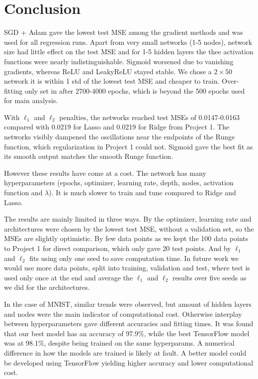 \documentclass[reprint,english,notitlepage, floatfix]{revtex4-2}  %
\begin{document}

\section{Conclusion} \label{sec: Conclusion}

SGD + Adam gave the lowest test MSE among the gradient methods and was used for all regression runs. Apart from very small networks (1-5 nodes), network size had little effect on the test MSE and for 1-5 hidden layers the thee activation functions were nearly indistinguishable. Sigmoid worsened due to vanishing gradients, whereas ReLU and LeakyReLU stayed stable. We chose a $2 \times 50$ network it is within 1 std of the lowest test MSE and cheaper to train. Over-fitting only set in after 2700-4000 epochs, which is beyond the 500 epochs used for main analysis. 

With $\ell_1$ and $\ell_2$ penalties, the networks reached test MSEs of 0.0147-0.0163 compared with 0.0219 for Lasso and 0.0219 for Ridge from Project 1. The networks visibly dampened the oscillations near the endpoints of the Runge function, which regularization in Project 1 could not. Sigmoid gave the best fit as its smooth output matches the smooth Runge function.

However these results have come at a cost. The network has many hyperparameters (epochs, optimizer, learning rate, depth, nodes, activation function and $\lambda$). It is much slower to train and tune compared to Ridge and Lasso. 


The results are mainly limited in three ways. By the optimizer, learning rate and architectures were chosen by the lowest test MSE, without a validation set, so the MSEs are slightly optimistic. By few data points as we kept the 100 data points to Project 1 for direct comparison, which only gave 20 test points. And by $\ell_1$ and $\ell_2$ fits using only one seed to save computation time. In future work we would use more data points, split into training, validation and test, where test is used only once at the end and average the $\ell_1$ and $\ell_2$ results over five seeds as we did for the architectures. 

In the case of MNIST, similar trends were observed, but amount of hidden layers and nodes were the main indicator of computational cost. Otherwise interplay between hyperparameters gave different accuracies and fitting times. It was found that our best model has an accuracy of 97.9\%, while the best TensorFlow model was at 98.1\%, despite being trained on the same hyperparams. A numerical difference in how the models are trained is likely at fault. A better model could be developed using TensorFlow yielding higher accuracy and lower computational cost. 
\end{document}
